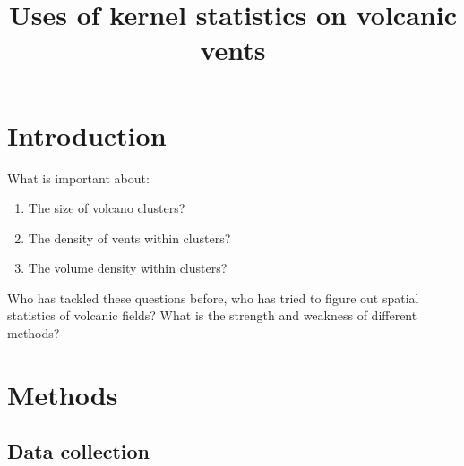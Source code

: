 \documentclass[12pt,letter]{article}
\title{Uses of kernel statistics on volcanic vents}
\date{}
\author{}
\begin{document}
\maketitle

\section{Introduction}

What is important about:
\begin{enumerate}
\item The size of volcano clusters?
\item The density of vents within clusters?
\item The volume density within clusters?
\end{enumerate}

Who has tackled these questions before, who has tried to figure out spatial statistics
of volcanic fields? What is the strength and weakness of different methods?








\section{Methods}

\subsection{Data collection}
\end{document}
